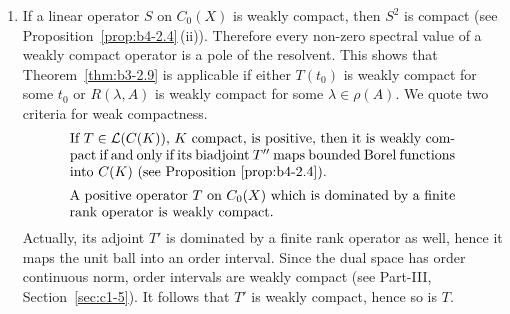 \begin{remarks}
\begin{enumerate}[\upshape (i), wide, labelindent=.25em]
	We sketch the proof of the equivalence of (a) and (b)
    assuming that $s(A) = 0$.
	If\/ $0$ is a first order pole, then the residue $P$ is a positive projection satisfying $PE = \Kern{A}$, $P'E' = \Kern{A'}$ (see Part-I, Example~\ref{ex:a3-3.6}).
	Thus given $0 < f \in \Kern{A}$ and any $0 \leq \psi \in E'$ such that $\langle f,\psi \rangle > 0$, we have for $\phi \coloneq P'\psi \in \Kern{A'}$, and
    \[
    \langle f,\phi \rangle = \langle f, P'\psi \rangle = \langle Pf,\psi \rangle = \langle f,\psi \rangle > 0 .
    \]
	To prove the reverse direction, we first observe that the highest coefficient $Q_{k}$ of the Laurent expansion is a positive operator.
	Thus if\/ $0$ is a pole of order $k \geq 2$, we choose $0 < h \in E$ such that $f \coloneq Q_{k}h > 0$.
	Then $Af = AQ_{k}h = 0$ and for every $\phi \in \Kern{A'}$ we have 
    \[
    \langle f,\phi \rangle = \langle Q_{k}h,\phi \rangle = \langle h,Q_{k}'\phi \rangle = \langle h,Q_{k-1}'A'\phi \rangle = 0 .
    \]
	\item 
	If a linear operator $S$ on $C_{0}(X)$ is weakly compact, then $S^{2}$ is compact (see Proposition~\ref{prop:b4-2.4}\,(ii)).
	Therefore every non-zero spectral value of a weakly compact operator is a pole of the resolvent.
	This shows that Theorem~\ref{thm:b3-2.9} is applicable if either $T(t_{0})$ is weakly compact for some $t_{0}$ or $R(\lambda,A)$ is weakly compact for some $\lambda \in \rho(A)$.
	We quote two criteria for weak compactness.
    \begin{equation}\label{eq:b3-2.31}
		\begin{minipage}{.8\textwidth}
    	If   $T \in \L{C(K)}$, $K$ compact, is positive, then it is weakly compact  	if and only if its biadjoint 	$T''$ maps bounded Borel functions into $C(K)$ (see Proposition~\ref{prop:b4-2.4}).
    	\end{minipage}
	\end{equation}
	\begin{equation}\label{eq:b3-2.32}
        \begin{minipage}{.8\textwidth}
    		A positive operator   $T$ on $C_{0}(X)$ which is dominated by a finite rank 
    		operator is weakly compact. 
    	\end{minipage}
    \end{equation}
    Actually, its adjoint  $T'$ is dominated by a finite rank operator as well, hence it maps the unit ball into an order interval. Since the dual space has order continuous norm, order intervals are weakly compact (see Part-III, Section~\ref{sec:c1-5}). 
	It follows that $ T' $  is weakly compact, hence so is $T$.		
		

\end{enumerate}
\end{remarks}
